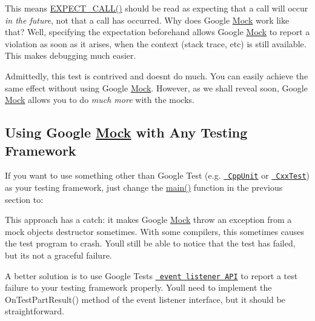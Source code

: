 This means {\ttfamily \mbox{\hyperlink{gmock-spec-builders_8h_a535a6156de72c1a2e25a127e38ee5232}{E\+X\+P\+E\+C\+T\+\_\+\+C\+A\+L\+L()}}} should be read as expecting that a call will occur {\itshape in the future}, not that a call has occurred. Why does Google \mbox{\hyperlink{classMock}{Mock}} work like that? Well, specifying the expectation beforehand allows Google \mbox{\hyperlink{classMock}{Mock}} to report a violation as soon as it arises, when the context (stack trace, etc) is still available. This makes debugging much easier.

Admittedly, this test is contrived and doesn\textquotesingle{}t do much. You can easily achieve the same effect without using Google \mbox{\hyperlink{classMock}{Mock}}. However, as we shall reveal soon, Google \mbox{\hyperlink{classMock}{Mock}} allows you to do {\itshape much more} with the mocks.

\subsection*{Using Google \mbox{\hyperlink{classMock}{Mock}} with Any Testing Framework}

If you want to use something other than Google Test (e.\+g. \href{http://sourceforge.net/projects/cppunit/}{\texttt{ Cpp\+Unit}} or \href{https://cxxtest.com/}{\texttt{ Cxx\+Test}}) as your testing framework, just change the {\ttfamily \mbox{\hyperlink{3_814_83_2CompilerIdC_2CMakeCCompilerId_8c_a0ddf1224851353fc92bfbff6f499fa97}{main()}}} function in the previous section to\+: 
\begin{DoxyCode}{0}
\DoxyCodeLine{\}}
\end{DoxyCode}


This approach has a catch\+: it makes Google \mbox{\hyperlink{classMock}{Mock}} throw an exception from a mock object\textquotesingle{}s destructor sometimes. With some compilers, this sometimes causes the test program to crash. You\textquotesingle{}ll still be able to notice that the test has failed, but it\textquotesingle{}s not a graceful failure.

A better solution is to use Google Test\textquotesingle{}s \href{../../googletest/docs/advanced.md\#extending-google-test-by-handling-test-events}{\texttt{ event listener A\+PI}} to report a test failure to your testing framework properly. You\textquotesingle{}ll need to implement the {\ttfamily On\+Test\+Part\+Result()} method of the event listener interface, but it should be straightforward.

